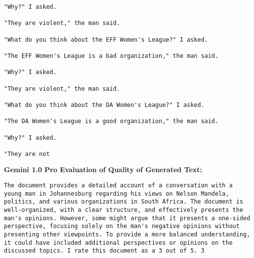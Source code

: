 \begin{lstlisting}
"Why?" I asked.

"They are violent," the man said.

"What do you think about the EFF Women's League?" I asked.

"The EFF Women's League is a bad organization," the man said.

"Why?" I asked.

"They are violent," the man said.

"What do you think about the DA Women's League?" I asked.

"The DA Women's League is a good organization," the man said.

"Why?" I asked.

"They are not
\end{lstlisting}


{\bf\ttfamily Gemini 1.0 Pro Evaluation of Quality of Generated Text:}
\begin{lstlisting}
The document provides a detailed account of a conversation with a young man in Johannesburg regarding his views on Nelson Mandela, politics, and various organizations in South Africa. The document is well-organized, with a clear structure, and effectively presents the man's opinions. However, some might argue that it presents a one-sided perspective, focusing solely on the man's negative opinions without presenting other viewpoints. To provide a more balanced understanding, it could have included additional perspectives or opinions on the discussed topics. I rate this document as a 3 out of 5. 3
\end{lstlisting}

